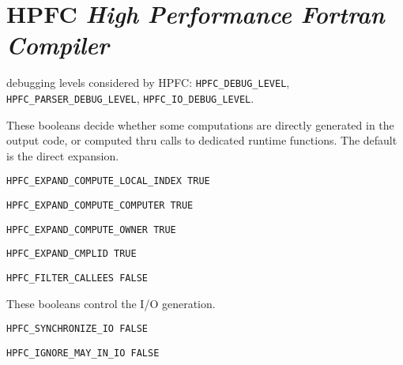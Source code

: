 \section{HPFC {\em High Performance Fortran Compiler}}

debugging levels considered by HPFC: {\tt HPFC\_DEBUG\_LEVEL}, 
{\tt HPFC\_PARSER\_DEBUG\_LEVEL}, {\tt HPFC\_IO\_DEBUG\_LEVEL}.

  These booleans decide whether some computations are directly
generated in the output code, or computed thru calls to dedicated
runtime functions. The default is the direct expansion.

\begin{verbatim}
HPFC_EXPAND_COMPUTE_LOCAL_INDEX TRUE
\end{verbatim}

\begin{verbatim}
HPFC_EXPAND_COMPUTE_COMPUTER TRUE
\end{verbatim}

\begin{verbatim}
HPFC_EXPAND_COMPUTE_OWNER TRUE
\end{verbatim}

\begin{verbatim}
HPFC_EXPAND_CMPLID TRUE
\end{verbatim}

\begin{verbatim}
HPFC_FILTER_CALLEES FALSE
\end{verbatim}

  These booleans control the I/O generation.

\begin{verbatim}
HPFC_SYNCHRONIZE_IO FALSE
\end{verbatim}

\begin{verbatim}
HPFC_IGNORE_MAY_IN_IO FALSE
\end{verbatim}





